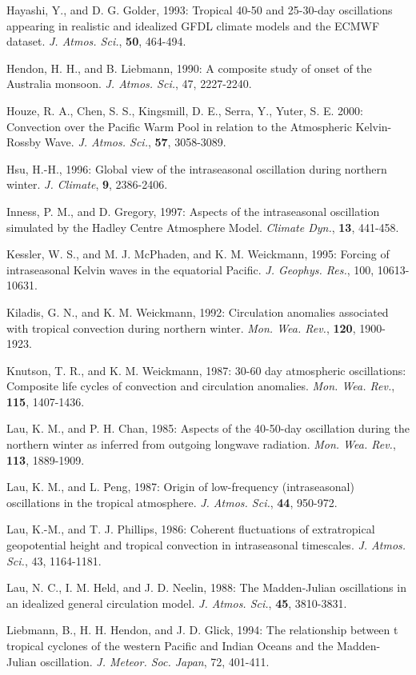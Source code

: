 \documentclass[12pt]{article}
\begin{document}
Hayashi, Y., and D. G. Golder, 1993: Tropical 40-50 and 25-30-day oscillations
appearing in realistic and idealized GFDL climate models and the ECMWF dataset.
{\it J. Atmos. Sci.}, {\bf 50}, 464-494.

Hendon, H. H., and B. Liebmann, 1990: A composite study of onset of the
Australia
monsoon. {\it J. Atmos. Sci.}, 47, 2227-2240.

Houze, R. A., Chen, S. S., Kingsmill, D. E., Serra, Y., 
Yuter, S. E. 2000: Convection over the Pacific Warm Pool in relation to 
the Atmospheric Kelvin-Rossby Wave. {\it J. Atmos. Sci.}, {\bf 57}, 3058-3089.

Hsu, H.-H., 1996: Global view of the intraseasonal oscillation during northern
winter.
{\it J. Climate}, {\bf 9}, 2386-2406.

Inness, P. M., and D. Gregory, 1997: Aspects of the intraseasonal oscillation
simulated by the Hadley Centre Atmosphere Model.
{\it Climate Dyn.}, {\bf 13}, 441-458.

Kessler, W. S., and M. J. McPhaden, and K. M. Weickmann, 1995: Forcing of
intraseasonal Kelvin waves in the equatorial Pacific. {\it J. Geophys. Res.},
100, 10613-10631.

Kiladis, G. N., and K. M. Weickmann, 1992: Circulation anomalies associated
with tropical convection during northern winter.
{\it Mon. Wea. Rev.}, {\bf 120}, 1900-1923.

Knutson, T. R., and K. M. Weickmann, 1987: 30-60 day atmospheric oscillations:
Composite life cycles of convection and circulation anomalies.
{\it Mon. Wea. Rev.}, {\bf 115}, 1407-1436.

Lau, K. M., and P. H. Chan, 1985: Aspects of the 40-50-day oscillation during 
the northern winter as inferred from outgoing longwave radiation. 
{\it Mon. Wea. Rev.},
{\bf 113}, 1889-1909.

Lau, K. M., and L. Peng, 1987: Origin of low-frequency (intraseasonal)
oscillations in the tropical atmosphere. {\it J. Atmos. Sci.},
{\bf 44}, 950-972.

Lau, K.-M., and T. J. Phillips, 1986: Coherent fluctuations of extratropical
geopotential height and tropical convection in intraseasonal timescales.
{\it J. Atmos.
Sci.}, 43, 1164-1181.

Lau, N. C., I. M. Held, and J. D. Neelin, 1988: The Madden-Julian oscillations
in an idealized general circulation model.
{\it J. Atmos. Sci.}, {\bf 45}, 3810-3831.

Liebmann, B., H. H. Hendon, and J. D. Glick, 1994: The relationship between t
tropical cyclones of the western Pacific and Indian Oceans and the Madden-Julian
oscillation. {\it J. Meteor. Soc. Japan}, 72, 401-411.
\end{document}

